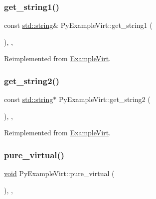 \subsubsection{\texorpdfstring{get\_string1()}{get\_string1()}}
{\footnotesize\ttfamily const \mbox{\hyperlink{_s_d_l__opengl__glext_8h_ab4ccfaa8ab0e1afaae94dc96ef52dde1}{std\+::string}}\& Py\+Example\+Virt\+::get\+\_\+string1 (\begin{DoxyParamCaption}{ }\end{DoxyParamCaption})\hspace{0.3cm}{\ttfamily [inline]}, {\ttfamily [override]}, {\ttfamily [virtual]}}



Reimplemented from \mbox{\hyperlink{class_example_virt_ab4f4498d072b7ca85eae10d0b504e8a0}{Example\+Virt}}.

\mbox{\label{class_py_example_virt_a55adfa6f3ddabdfa860a4593ce39e5d2}} 
\subsubsection{\texorpdfstring{get\_string2()}{get\_string2()}}
{\footnotesize\ttfamily const \mbox{\hyperlink{_s_d_l__opengl__glext_8h_ab4ccfaa8ab0e1afaae94dc96ef52dde1}{std\+::string}}$\ast$ Py\+Example\+Virt\+::get\+\_\+string2 (\begin{DoxyParamCaption}{ }\end{DoxyParamCaption})\hspace{0.3cm}{\ttfamily [inline]}, {\ttfamily [override]}, {\ttfamily [virtual]}}



Reimplemented from \mbox{\hyperlink{class_example_virt_a21e6415d476fba511303b5dc897dfc83}{Example\+Virt}}.

\mbox{\label{class_py_example_virt_a1ab7aed255c6c2ed1f5c2e287efe1847}} 
\subsubsection{\texorpdfstring{pure\_virtual()}{pure\_virtual()}}
{\footnotesize\ttfamily \mbox{\hyperlink{_s_d_l__opengles2__gl2ext_8h_ae5d8fa23ad07c48bb609509eae494c95}{void}} Py\+Example\+Virt\+::pure\+\_\+virtual (\begin{DoxyParamCaption}{ }\end{DoxyParamCaption})\hspace{0.3cm}{\ttfamily [inline]}, {\ttfamily [override]}, {\ttfamily [virtual]}}



